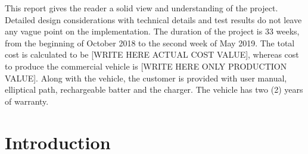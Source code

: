 \documentclass[a4paper,12pt]{article}
\begin{document}
This report gives the reader a solid view and understanding of the project. Detailed design considerations with technical details and test results do not leave any vague point on the implementation. The duration of the project is 33 weeks, from the beginning of October 2018 to the second week of May 2019. The total cost is calculated to be [WRITE HERE ACTUAL COST VALUE], whereas cost to produce the commercial vehicle is [WRITE HERE ONLY PRODUCTION VALUE]. Along with the vehicle, the customer is provided with user manual, elliptical path, rechargeable batter and the charger. The vehicle has two (2) years of warranty.
\newpage
	\section{Introduction}



\end{document}
